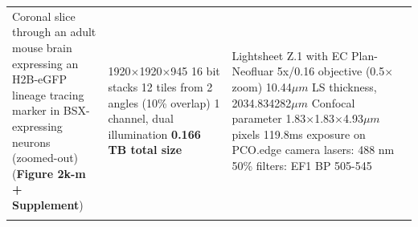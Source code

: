 \documentclass[]{spie}  %
\begin{document}
\begin{landscape}
{\begin{longtable}{lll}
\makecell[l]{Coronal slice through an adult \\mouse brain expressing an H2B-eGFP \\lineage tracing marker in BSX-expressing \\neurons  (zoomed-out) \\(\textbf{Figure 2k-m + Supplement})} &  \makecell[l]{1920$\times$1920$\times$945 16 bit stacks\\12 tiles from 2 angles (10\% overlap) \\1 channel, dual illumination\\\textbf{0.166 TB total size}}  &  \makecell[l]{Lightsheet Z.1 with EC Plan-Neofluar 5x/0.16 objective (0.5$\times$ zoom)\\ 10.44$\mu{}m$ LS thickness, 2034.834282$\mu{}m$ Confocal parameter\\1.83$\times$1.83$\times$4.93$\mu{}m$ pixels\\119.8ms exposure on PCO.edge camera\\lasers: 488 nm 50\%\\filters: EF1 BP 505-545} \\ \\


\end{longtable}}
\end{landscape}
\end{document}
